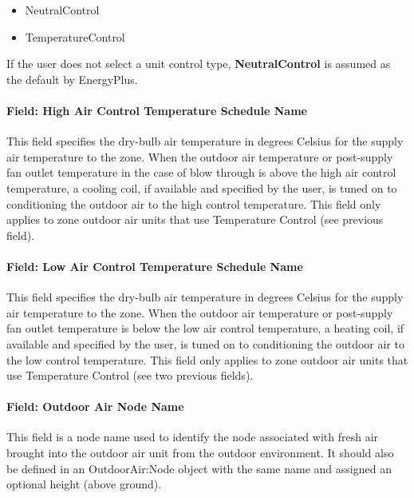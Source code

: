 \begin{itemize}
\item
  NeutralControl
\item
  TemperatureControl
\end{itemize}

If the user does not select a unit control type, \textbf{NeutralControl} is assumed as the default by EnergyPlus.

\paragraph{Field: High Air Control Temperature Schedule Name}\label{field-high-air-control-temperature-schedule-name}

This field specifies the dry-bulb air temperature in degrees Celsius for the supply air temperature to the zone. When the outdoor air temperature or post-supply fan outlet temperature in the case of blow through is above the high air control temperature, a cooling coil, if available and specified by the user, is tuned on to conditioning the outdoor air to the high control temperature. This field only applies to zone outdoor air units that use Temperature Control (see previous field).

\paragraph{Field: Low Air Control Temperature Schedule Name}\label{field-low-air-control-temperature-schedule-name}

This field specifies the dry-bulb air temperature in degrees Celsius for the supply air temperature to the zone. When the outdoor air temperature or post-supply fan outlet temperature is below the low air control temperature, a heating coil, if available and specified by the user, is tuned on to conditioning the outdoor air to the low control temperature. This field only applies to zone outdoor air units that use Temperature Control (see two previous fields).

\paragraph{Field: Outdoor Air Node Name}\label{field-outdoor-air-node-name-1-000}

This field is a node name used to identify the node associated with fresh air brought into the outdoor air unit from the outdoor environment. It should also be defined in an OutdoorAir:Node object with the same name and assigned an optional height (above ground).

